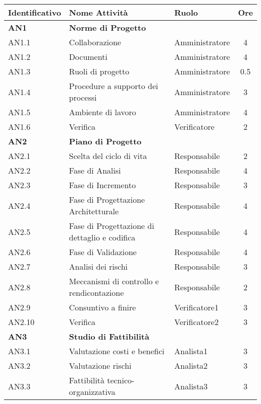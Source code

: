 \begin{longtable}{|l|l|l|c|}
  \endfirsthead
  \hline
  \textbf{Identificativo} &
  \textbf{Nome Attività} &
  \textbf{Ruolo} &
  \textbf{Ore}\\
  \endhead
  \hline
  \textbf{AN1} & \textbf{Norme di Progetto} &  &  \\
  \hline
  	{AN1.1} & Collaborazione & Amministratore  & 4\\
  	\hline
  	{AN1.2} & Documenti & Amministratore & 4\\
  	\hline
  	{AN1.3} & {Ruoli di progetto} & Amministratore &  0.5\\
  	\hline
  	{AN1.4} & {Procedure a supporto dei processi} & Amministratore  &  3\\
  	\hline
  	{AN1.5} & {Ambiente di lavoro} & Amministratore &  4\\
  	\hline
  	{AN1.6} & {Verifica} & Verificatore & 2 \\
  \hline
  \textbf{AN2} & \textbf{Piano di Progetto}  & & \\
    \hline
    	{AN2.1} & {Scelta del ciclo di vita} & Responsabile &  2\\
    	\hline
    	{AN2.2} & {Fase di Analisi} & Responsabile& 4 \\
    	\hline
    	{AN2.3} & {Fase di Incremento} & Responsabile& 3 \\
    	\hline
    	{AN2.4} & {Fase di Progettazione Architetturale} & Responsabile &   4\\
    	\hline
    	{AN2.5} & {Fase di Progettazione di dettaglio e codifica} & Responsabile  &  4\\
    	\hline
    	{AN2.6} & {Fase di Validazione} & Responsabile  &  4\\
    	\hline
    	{AN2.7} & {Analisi dei rischi} & Responsabile  &  3\\
    	\hline
    	{AN2.8} & {Meccanismi di controllo e rendicontazione} & Responsabile & 2\\
    	\hline
    	{AN2.9} & {Consuntivo a finire} & Verificatore1  & 3\\
    	\hline
    	{AN2.10} & {Verifica} & Verificatore2  & 3 \\
    \hline
    \textbf{AN3} & \textbf{Studio di Fattibilità}  & &  \\
      \hline
      	{AN3.1} & {Valutazione costi e benefici} & Analista1  & 3 \\
      	\hline
      	{AN3.2} & {Valutazione rischi} & Analista2 & 3\\
      	\hline
      	{AN3.3} & {Fattibilità tecnico-organizzativa} & Analista3  & 3 \\

\end{longtable}
